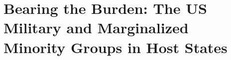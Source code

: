 \chapter{Bearing the Burden: The US Military and Marginalized Minority Groups in Host States \label{cha:min}}


\doublespacing




